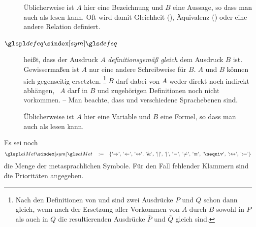 \begin{description}
	Üblicherweise ist $A$ hier eine Bezeichnung und $B$ eine Aussage, so dass man  auch als  lesen kann.
	Oft wird damit Gleichheit (\symqt{$=$}), Äquivalenz (\symqt{$\equiv$}) oder eine andere Relation definiert.
	\item[$\glsSym{defeq}$~\emph{\Idx{Definition}}]
	 heißt, dass der Ausdruck $A$ \emph{definitionsgemäß gleich} dem Ausdruck $B$ ist.
	Gewissermaßen ist $A$ nur eine andere Schreibweise für $B$.
	$A$ und $B$ können sich gegenseitig ersetzten.%
	\footnote{%
		Nach den Definitionen von \symqt{$\metadefeq$} und  sind zwei Ausdrücke $P$ und $Q$ schon dann gleich, wenn nach der Ersetzung aller Vorkommen von $A$ durch $B$ sowohl in $P$ als auch in $Q$ die resultierenden Ausdrücke $\overline{P}$ und $\overline{Q}$ gleich sind.%
	}
	$B$ darf dabei von $A$ weder direkt noch indirekt abhängen, \textdh\ $A$ darf in $B$ und zugehörigen Definitionen noch nicht vorkommen.
	-- Man beachte, dass \symqt{$\metadefeq$} und  verschiedene Sprachebenen sind.

	Üblicherweise ist $A$ hier eine Variable und $B$ eine Formel, so dass man  auch als  lesen kann.
\end{description}
%
Es sei noch
\[
	\label{eq:asM} \glsSym{alMet} \quad \defeq \quad \{ \text{\symqt{$\metaimp$}, \symqt{$\metarep$}, \symqt{$\metaequiv$}, \symqt{$\metaand$}, \symqt{$\metaor$}, \symqt{$\srand$}, \symqt{$\eq$}, \symqt{$\ne$}, \symqt{$\equiv$}, \symqt{$\nequiv$}, \symqt{$\metadefeq$}, \symqt{$\defeq$}} \}
\]
die Menge der metasprachlichen Symbole.
Für den Fall fehlender Klammern sind die Prioritäten  angegeben.

